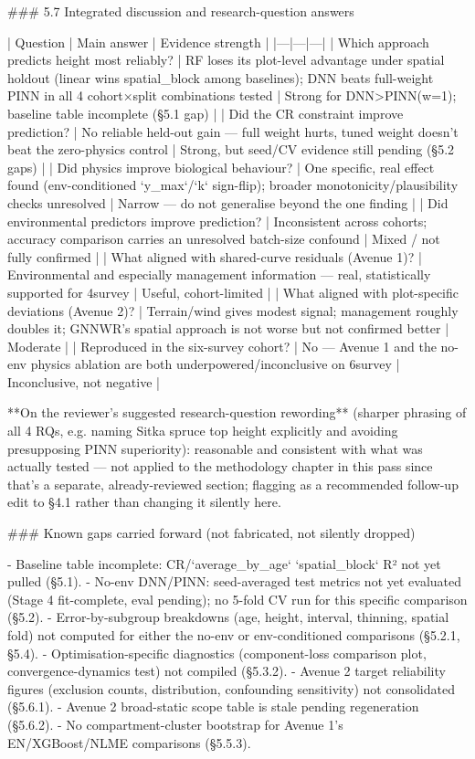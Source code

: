 ### 5.7 Integrated discussion and research-question answers

| Question | Main answer | Evidence strength |
|---|---|---|
| Which approach predicts height most reliably? | RF loses its plot-level advantage under spatial holdout (linear wins spatial_block among baselines); DNN beats full-weight PINN in all 4 cohort×split combinations tested | Strong for DNN>PINN(w=1); baseline table incomplete (§5.1 gap) |
| Did the CR constraint improve prediction? | No reliable held-out gain — full weight hurts, tuned weight doesn't beat the zero-physics control | Strong, but seed/CV evidence still pending (§5.2 gaps) |
| Did physics improve biological behaviour? | One specific, real effect found (env-conditioned `y_max`/`k` sign-flip); broader monotonicity/plausibility checks unresolved | Narrow — do not generalise beyond the one finding |
| Did environmental predictors improve prediction? | Inconsistent across cohorts; accuracy comparison carries an unresolved batch-size confound | Mixed / not fully confirmed |
| What aligned with shared-curve residuals (Avenue 1)? | Environmental and especially management information — real, statistically supported for 4survey | Useful, cohort-limited |
| What aligned with plot-specific deviations (Avenue 2)? | Terrain/wind gives modest signal; management roughly doubles it; GNNWR's spatial approach is not worse but not confirmed better | Moderate |
| Reproduced in the six-survey cohort? | No — Avenue 1 and the no-env physics ablation are both underpowered/inconclusive on 6survey | Inconclusive, not negative |

**On the reviewer's suggested research-question rewording** (sharper phrasing of all 4 RQs, e.g. naming Sitka spruce top height explicitly and avoiding presupposing PINN superiority): reasonable and consistent with what was actually tested — not applied to the methodology chapter in this pass since that's a separate, already-reviewed section; flagging as a recommended follow-up edit to §4.1 rather than changing it silently here.

### Known gaps carried forward (not fabricated, not silently dropped)

- Baseline table incomplete: CR/`average_by_age` `spatial_block` R² not yet pulled (§5.1).
- No-env DNN/PINN: seed-averaged test metrics not yet evaluated (Stage 4 fit-complete, eval pending); no 5-fold CV run for this specific comparison (§5.2).
- Error-by-subgroup breakdowns (age, height, interval, thinning, spatial fold) not computed for either the no-env or env-conditioned comparisons (§5.2.1, §5.4).
- Optimisation-specific diagnostics (component-loss comparison plot, convergence-dynamics test) not compiled (§5.3.2).
- Avenue 2 target reliability figures (exclusion counts, distribution, confounding sensitivity) not consolidated (§5.6.1).
- Avenue 2 broad-static scope table is stale pending regeneration (§5.6.2).
- No compartment-cluster bootstrap for Avenue 1's EN/XGBoost/NLME comparisons (§5.5.3).

